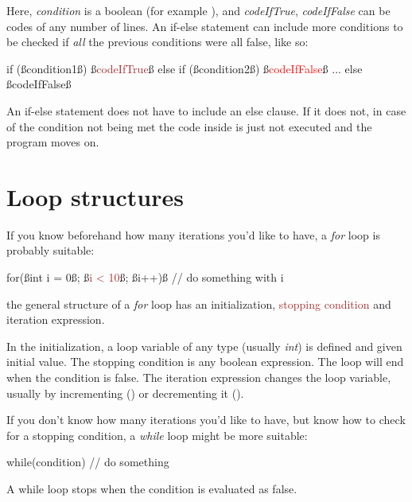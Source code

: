 Here, \textit{condition} is a boolean (for example ), and \textit{codeIfTrue}, \textit{codeIfFalse} can be codes of any number of lines. An if-else statement can include more conditions to be checked if \emph{all} the previous conditions were all false, like so:

\begin{code}
if (ß\textcolor{mygreen}{condition1}ß) 
{
    ß\textcolor{Brown}{codeIfTrue}ß
}
else if (ß\textcolor{mygreen}{condition2}ß)
{
    ß\textcolor{Red}{codeIfFalse}ß
}
...
else{
    ß\textcolor{Rhodamine}{codeIfFalse}ß
}
\end{code}

An if-else statement does not have to include an else clause. If it does not, in case of the condition not being met the code inside is just not executed and the program moves on.

\section{Loop structures}

If you know beforehand how many iterations you'd like to have, a \textit{for} loop is probably suitable:

\begin{code}
for(ß\textcolor{mygreen}{int i = 0}ß; ß\textcolor{Brown}{i < 10}ß; ß\textcolor{Rhodamine}{i++})ß {
    // do something with i
}
\end{code}

the general structure of a \textit{for} loop has an \textcolor{mygreen}{initialization}, \textcolor{Brown}{stopping condition} and \textcolor{Rhodamine}{iteration expression}. 

In the initialization, a loop variable of any type (usually \textit{int}) is defined and given initial value. The stopping condition is any boolean expression. The loop will end when the condition is false. The iteration expression changes the loop variable, usually by incrementing () or decrementing it ().

If you don't know how many iterations you'd like to have, but know how to check for a stopping condition, a \textit{while} loop might be more suitable:

\begin{code}
while(condition){
    // do something
}
\end{code}

A while loop stops when the condition is evaluated as false. 

